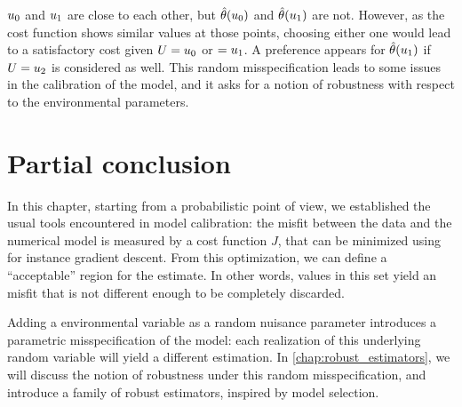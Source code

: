 \documentclass[../../Main_ManuscritThese.tex]{subfiles}
\begin{document}
 $u_0$ and $u_1$ are close to each other, but $\hat{\theta}(u_0)$ and $\hat{\theta}(u_1)$ are not. However, as the cost function shows similar values at those points, choosing either one would lead to a satisfactory cost given $U = u_0$ or $=u_1$. A preference appears for $\hat{\theta}(u_1)$ if $U = u_2$ is considered as well.
 This random misspecification leads to some issues in the calibration of the model, and it asks for a notion of robustness with respect to the environmental parameters.

\section{Partial conclusion}
\label{sec:chap2_partial}

In this chapter, starting from a probabilistic point of view, we established the usual tools encountered in model calibration: the misfit between the data and the numerical model is measured by a cost function $J$, that can be minimized using for instance gradient descent. From this optimization, we can define a ``acceptable'' region for the estimate. In other words, values in this set yield an misfit that is not different enough to be completely discarded.

Adding a environmental variable as a random nuisance parameter introduces a parametric misspecification of the model: each realization of this underlying random variable will yield a different estimation. In \cref{chap:robust_estimators}, we will discuss the notion of robustness under this random misspecification, and introduce a family of robust estimators, inspired by model selection. 




\subfileLocal{
	\pagestyle{empty}
	
	
}
\end{document}
